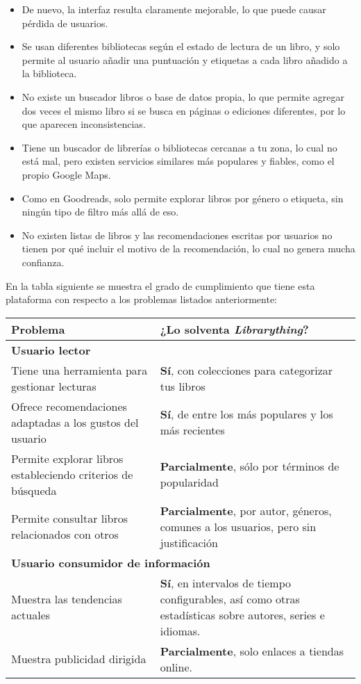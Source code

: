 \begin{itemize}
\item De nuevo, la interfaz resulta claramente mejorable, lo que puede causar pérdida de usuarios.
\item Se usan diferentes bibliotecas según el estado de lectura de un libro, y solo permite al usuario añadir una puntuación y etiquetas a cada libro añadido a la biblioteca.
\item No existe un buscador libros o base de datos propia, lo que permite agregar dos veces el mismo libro si se busca en páginas o ediciones diferentes, por lo que aparecen inconsistencias.
\item Tiene un buscador de librerías o bibliotecas cercanas a tu zona, lo cual no está mal, pero existen servicios similares más populares y fiables, como el propio Google Maps.
\item Como en Goodreads, solo permite explorar libros por género o etiqueta, sin ningún tipo de filtro más allá de eso.
\item No existen listas de libros y las recomendaciones escritas por usuarios no tienen por qué incluir el motivo de la recomendación, lo cual no genera mucha confianza.
\end{itemize}

En la tabla siguiente se muestra el grado de cumplimiento que tiene esta plataforma con respecto a los problemas listados anteriormente:

\begin{table}[H]
    \begin{tabularx}{\linewidth}{|X|X|}
        \hline
        \textbf{Problema} & \textbf{¿Lo solventa \textit{Librarything}?} \\
        \hline
        \hline
        \multicolumn{2}{|l|}{\textbf{Usuario lector}} \\
        \hline
        Tiene una herramienta para gestionar lecturas     & \textbf{Sí}, con colecciones para categorizar tus libros \\ 
        \hline
        Ofrece recomendaciones adaptadas a los gustos del usuario & \textbf{Sí}, de entre los más populares y los más recientes \\ 
        \hline
        Permite explorar libros estableciendo criterios de búsqueda   & \textbf{Parcialmente}, sólo por términos de popularidad \\ 
        \hline
        Permite consultar libros relacionados con otros   & \textbf{Parcialmente}, por autor, géneros, comunes a los usuarios, pero sin justificación \\ 
        \hline
        \multicolumn{2}{|l|}{ \textbf{Usuario consumidor de información}} \\
        \hline
        Muestra las tendencias actuales     & \textbf{Sí}, en intervalos de tiempo configurables, así como otras estadísticas sobre autores, series e idiomas. \\ 
        \hline
        Muestra publicidad dirigida     & \textbf{Parcialmente}, solo enlaces a tiendas online. \\ 
        \hline
    \end{tabularx}
\end{table}

